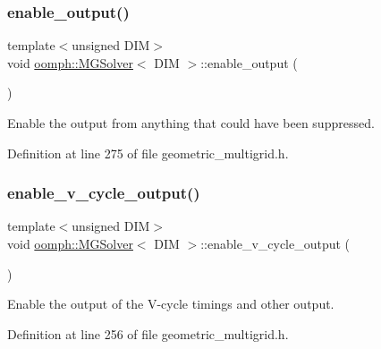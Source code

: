 \subsubsection{\texorpdfstring{enable\+\_\+output()}{enable\_output()}}
{\footnotesize\ttfamily template$<$unsigned D\+IM$>$ \\
void \hyperlink{classoomph_1_1MGSolver}{oomph\+::\+M\+G\+Solver}$<$ D\+IM $>$\+::enable\+\_\+output (\begin{DoxyParamCaption}{ }\end{DoxyParamCaption})\hspace{0.3cm}{\ttfamily [inline]}}



Enable the output from anything that could have been suppressed. 



Definition at line 275 of file geometric\+\_\+multigrid.\+h.

\mbox{\label{classoomph_1_1MGSolver_a34098c30d954bc884b7df62ec61bd836}} 
\subsubsection{\texorpdfstring{enable\+\_\+v\+\_\+cycle\+\_\+output()}{enable\_v\_cycle\_output()}}
{\footnotesize\ttfamily template$<$unsigned D\+IM$>$ \\
void \hyperlink{classoomph_1_1MGSolver}{oomph\+::\+M\+G\+Solver}$<$ D\+IM $>$\+::enable\+\_\+v\+\_\+cycle\+\_\+output (\begin{DoxyParamCaption}{ }\end{DoxyParamCaption})\hspace{0.3cm}{\ttfamily [inline]}}



Enable the output of the V-\/cycle timings and other output. 



Definition at line 256 of file geometric\+\_\+multigrid.\+h.

\mbox{\label{classoomph_1_1MGSolver_a104b2f66ce3e177c31cdd666bbc1f17d}} 

